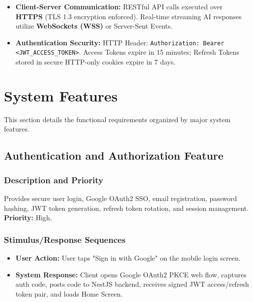 \documentclass[11pt,a4paper]{article}
\begin{document}
\begin{itemize}
    \item \textbf{Client-Server Communication:} RESTful API calls executed over \textbf{HTTPS} (TLS 1.3 encryption enforced). Real-time streaming AI responses utilize \textbf{WebSockets (WSS)} or Server-Sent Events.
    \item \textbf{Authentication Security:} HTTP Header: \texttt{Authorization: Bearer <JWT\_ACCESS\_TOKEN>}. Access Tokens expire in 15 minutes; Refresh Tokens stored in secure HTTP-only cookies expire in 7 days.
\end{itemize}

\newpage
\section{System Features}

This section details the functional requirements organized by major system features.

\subsection{Authentication and Authorization Feature}
\subsubsection{Description and Priority}
Provides secure user login, Google OAuth2 SSO, email registration, password hashing, JWT token generation, refresh token rotation, and session management. \\
\textbf{Priority:} High.

\subsubsection{Stimulus/Response Sequences}
\begin{itemize}
    \item \textbf{User Action:} User taps "Sign in with Google" on the mobile login screen.
    \item \textbf{System Response:} Client opens Google OAuth2 PKCE web flow, captures auth code, posts code to NestJS backend, receives signed JWT access/refresh token pair, and loads Home Screen.
\end{itemize}
\end{document}
